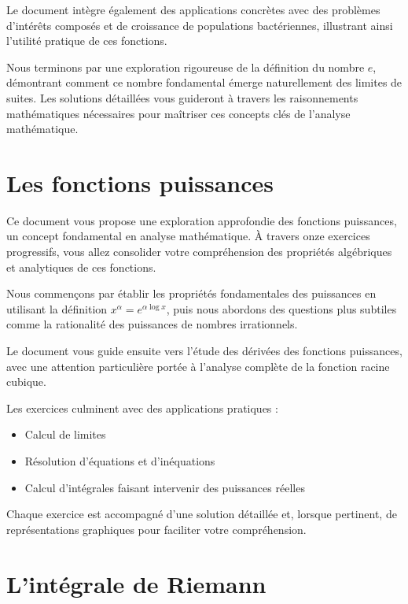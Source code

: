 \documentclass[
  12pt,
  letterpaper,
]{book}
\providecommand{\tightlist}{%
  \setlength{\itemsep}{0pt}\setlength{\parskip}{0pt}}\usepackage{longtable,booktabs,array}
\theoremstyle{remark}
\begin{document}
Le document intègre également des applications concrètes avec des
problèmes d'intérêts composés et de croissance de populations
bactériennes, illustrant ainsi l'utilité pratique de ces fonctions.

Nous terminons par une exploration rigoureuse de la définition du nombre
\(e\), démontrant comment ce nombre fondamental émerge naturellement des
limites de suites. Les solutions détaillées vous guideront à travers les
raisonnements mathématiques nécessaires pour maîtriser ces concepts clés
de l'analyse mathématique.

\hypertarget{les-fonctions-puissances}{%
\section*{Les fonctions puissances}\label{les-fonctions-puissances}}


Ce document vous propose une exploration approfondie des fonctions
puissances, un concept fondamental en analyse mathématique. À travers
onze exercices progressifs, vous allez consolider votre compréhension
des propriétés algébriques et analytiques de ces fonctions.

Nous commençons par établir les propriétés fondamentales des puissances
en utilisant la définition \(x^{\alpha} = e^{\alpha \log x}\), puis nous
abordons des questions plus subtiles comme la rationalité des puissances
de nombres irrationnels.

Le document vous guide ensuite vers l'étude des dérivées des fonctions
puissances, avec une attention particulière portée à l'analyse complète
de la fonction racine cubique.

Les exercices culminent avec des applications pratiques :

\begin{itemize}
\tightlist
\item
  Calcul de limites
\item
  Résolution d'équations et d'inéquations
\item
  Calcul d'intégrales faisant intervenir des puissances réelles
\end{itemize}

Chaque exercice est accompagné d'une solution détaillée et, lorsque
pertinent, de représentations graphiques pour faciliter votre
compréhension.

\hypertarget{lintuxe9grale-de-riemann}{%
\section*{L'intégrale de Riemann}\label{lintuxe9grale-de-riemann}}
\end{document}
